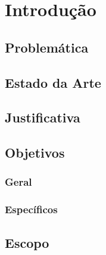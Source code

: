 \chapter{Introdução}
	\section{Problemática}

	\section{Estado da Arte}

	\section{Justificativa}

	\section{Objetivos}
		\subsection{Geral}
		\subsection{Específicos}

	\section{Escopo}
